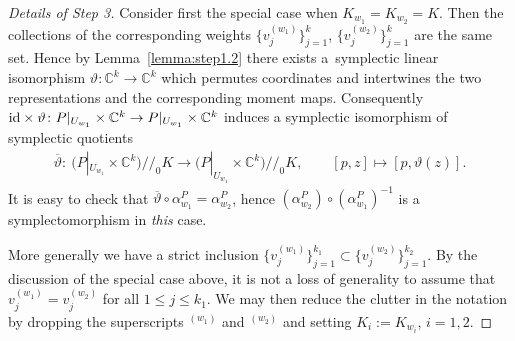 \documentclass[10pt,a4paper]{amsart}
\numberwithin{equation}{section}
\begin{document}
\begin{proof}[Details of Step 3]
Consider f\/irst the special case when $K_{w_1} = K_{w_2} =K$.  Then the
collections of the correspon\-ding weights $\{
v_j^{(w_1)}\}_{j=1}^k$, $\{ v_j^{(w_2)}\}_{j=1}^k$ are the same set.
Hence by Lemma~\ref{lemma:step1.2} there exists a~symplectic linear
isomorphism $\vartheta\colon {\mathbb C}^k\to {\mathbb C}^k$ which permutes coordinates and
intertwines the two representations and the corresponding moment maps.
Consequently ${\rm id}\times \vartheta\colon P|_{U_{w_1}}\times {\mathbb C}^k \to
  P|_{U_{w_1}} \times {\mathbb C}^k$ induces a symplectic isomorphism of
    symplectic quotients
\begin{gather*}
\overline{\vartheta}\colon \ \big(P|_{U_{w_1}}\times {\mathbb C}^k\big)/\!/_0 K\to
  \big(P|_{U_{w_1}}\times {\mathbb C}^k\big)/\!/_0 K,\qquad [p,z]\mapsto [p,
    \vartheta(z)].
\end{gather*}
It is easy to check that $\overline{\vartheta}\circ \alpha^P_{w_1} =
\alpha^P_{w_2}$, hence $(\alpha^P_{w_2 })\circ (\alpha^P_{w_1})^{-1}$
is a symplectomorphism in {\em this} case.

More generally we have a strict inclusion $\{
v_j^{(w_1)}\}_{j=1}^{k_1}\subset \{ v_j^{(w_2)}\}_{j=1}^{k_2}$.  By
the discussion of the special case above, it is not a loss of generality
to assume that $v_j^{(w_1)} = v_j^{(w_2)}$ for all $1\leq j\leq k_1$.
We may then reduce the clutter in the notation by dropping the
superscripts $^{(w_1)}$ and $^{(w_2)}$ and setting $K_i:=K_{w_i}$, $i=1,2$.


\end{proof}
\end{document}

